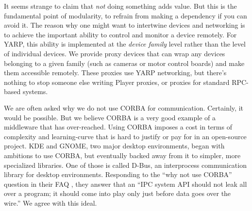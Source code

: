 It seems strange to claim that {\em not} doing something adds value.
But this is the fundamental point of modularity, to refrain from 
making a dependency if you can avoid it.
%
The reason why one might want to intertwine devices and networking
is to achieve the important ability to control and monitor a device 
remotely.  For YARP, this ability is implemented at the 
{\em device family} level rather than the level of individual devices.
We provide proxy devices that can wrap any devices belonging to
a given family (such as cameras or motor control boards) and make 
them accessible remotely.  These proxies use YARP networking, but
there's nothing to stop someone else writing Player proxies, or 
proxies for standard RPC-based systems.

We are often asked why we do not use CORBA for communication.
Certainly, it would be possible.  But we believe CORBA is a very good
example of a middleware that has over-reached.  Using CORBA imposes a
cost in terms of complexity and learning-curve that is hard to justify
or pay for in an open-source project.  KDE and GNOME, two major
desktop environments, began with ambitions to use CORBA, but eventually
backed away from it to simpler, more specialized libraries.
One of those is called D-Bus, 
an interprocess communication library for desktop environments.
Responding to the ``why not use CORBA'' question
in their FAQ  \cite{dbus},
they answer that an
``IPC system API should not leak all over a program; it should come
into play only just before data goes over the wire.''  
We agree with this ideal.



%
%




